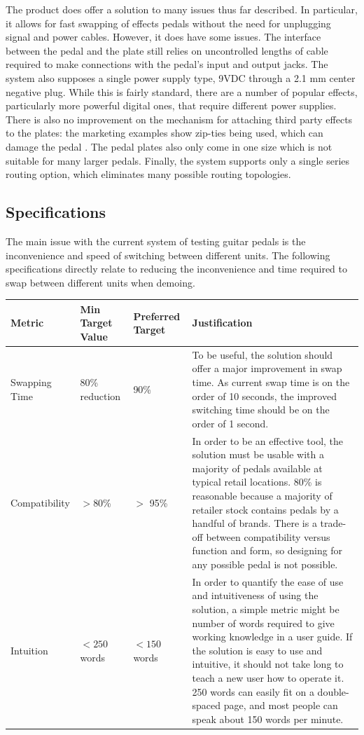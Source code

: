 \documentclass{article}
\begin{document}
		The product does offer a solution to many issues thus far described.  In particular, it allows for fast swapping of effects pedals without the need for unplugging signal and power cables.  However, it does have some issues.  The interface between the pedal and the plate still relies on uncontrolled lengths of cable required to make connections with the pedal's input and output jacks.  The system also supposes a single power supply type, 9VDC through a 2.1 mm center negative plug.  While this is fairly standard, there are a number of popular effects, particularly more powerful digital ones, that require different power supplies.  There is also no improvement on the mechanism for attaching third party effects to the plates: the marketing examples show zip-ties being used, which can damage the pedal \cite{conNEXI}.  The pedal plates also only come in one size which is not suitable for many larger pedals.  Finally, the system supports only a single series routing option, which eliminates many possible routing topologies.

	

	\subsection{Specifications}
	The main issue with the current system of testing guitar pedals is the inconvenience and speed of switching between different units.  The following specifications directly relate to reducing the inconvenience and time required to swap between different units when demoing.

	\begin{center}
	\renewcommand{\arraystretch}{1.5}
	\begin{tabular}{|l|l|l|p{6cm}|}
		\hline
		Metric & Min Target Value & Preferred Target & Justification \\
		\hline
		Swapping Time & 80\% reduction & 90\% & To be useful, the solution should offer a major improvement in swap time.  As current swap time is on the order of 10 seconds, the improved switching time should be on the order of 1 second.\\
		Compatibility &  $>$80\% & $>$ 95\% & In order to be an effective tool, the solution must be usable with a majority of pedals available at typical retail locations.  80\% is reasonable because a majority of retailer stock contains pedals by a handful of brands.  There is a trade-off between compatibility versus function and form, so designing for any possible pedal is not possible. \\
		Intuition & $< 250$ words& $< 150$ words & In order to quantify the ease of use and intuitiveness of using the solution, a simple metric might be number of words required to give working knowledge in a user guide.  If the solution is easy to use and intuitive, it should not take long to teach a new user how to operate it.  250 words can easily fit on a double-spaced page, and most people can speak about 150 words per minute. \\
		\hline
	\end{tabular}
	\end{center}
\end{document}

